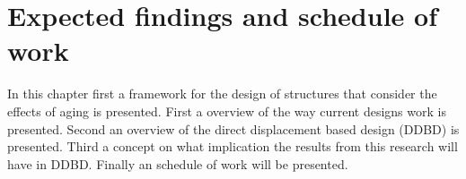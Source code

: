 \chapter{Expected findings and schedule of work}
In this chapter first a framework for the design of structures that consider the effects of aging is presented. First a overview of the way current designs work is presented. Second an overview of the direct displacement based design (DDBD) is presented. Third a concept on what implication the results from this research will have in DDBD. Finally an schedule of work will be presented.

